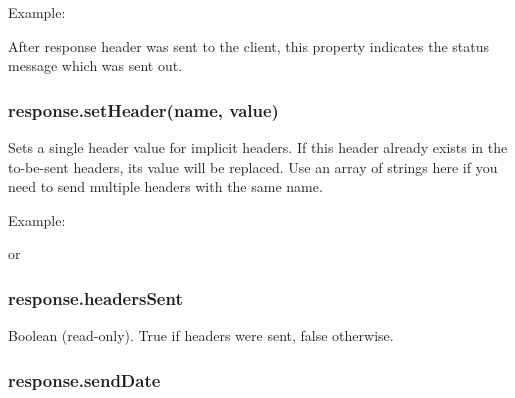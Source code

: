 Example:

\begin{Shaded}
\begin{Highlighting}[]
 \NormalTok{= }\NormalTok{;}
\end{Highlighting}
\end{Shaded}

After response header was sent to the client, this property indicates
the status message which was sent out.

\subsubsection{response.setHeader(name,
value)}\label{response.setheadername-value}

Sets a single header value for implicit headers. If this header already
exists in the to-be-sent headers, its value will be replaced. Use an
array of strings here if you need to send multiple headers with the same
name.

Example:

\begin{Shaded}
\begin{Highlighting}[]
\NormalTok{(}\NormalTok{, }\NormalTok{);}
\end{Highlighting}
\end{Shaded}

or

\begin{Shaded}
\begin{Highlighting}[]
\NormalTok{(}\NormalTok{, [}\NormalTok{, }\NormalTok{]);}
\end{Highlighting}
\end{Shaded}

\subsubsection{response.headersSent}\label{response.headerssent}

Boolean (read-only). True if headers were sent, false otherwise.

\subsubsection{response.sendDate}\label{response.senddate}

